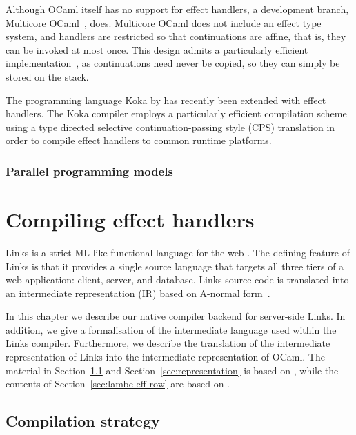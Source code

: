 \documentclass[12pt,mscres,cdtppar,twoside,openright,logo,rightchapter,normalheadings]{infthesis}
\theoremstyle{definition}
\newcommand{\todo}[1]{{\par\noindent\small\color{red} \framebox{\parbox{\dimexpr\linewidth-2\fboxsep-2\fboxrule}{\textbf{TODO:} #1}}}}
\begin{document}
Although OCaml itself has no support for effect handlers, a
development branch, Multicore OCaml~\citep{Dolan2015}, does. Multicore
OCaml does not include an effect type system, and handlers are
restricted so that continuations are affine, that is, they can be
invoked at most once. This design admits a particularly efficient
implementation~\citep{Bruggeman1996}, as continuations need never be
copied, so they can simply be stored on the stack.

The programming language Koka by \citet{Leijen2016} has recently
been extended with effect handlers. The Koka compiler employs a
particularly efficient compilation scheme using a type directed
selective continuation-passing style (CPS) translation in order to
compile effect handlers to common runtime platforms.

\subsection{Parallel programming models}
\todo{\cite{Marlow2013}}

\chapter{Compiling effect handlers}
\label{ch:compiling}

Links is a strict ML-like functional language for the web
\citep{Cooper2006}. The defining feature of Links is that it provides
a single source language that targets all three tiers of a web
application: client, server, and database. Links source code is
translated into an intermediate representation (IR) based on A-normal
form~\citep{Flanagan1993}.

In this chapter we describe our native compiler backend for
server-side Links. In addition, we give a formalisation of the
intermediate language used within the Links compiler. Furthermore, we
describe the translation of the intermediate representation of Links
into the intermediate representation of OCaml. The material in
Section~\ref{sec:compilation-strategy} and
Section~\ref{sec:representation} is based on \cite{Hillerstrom2016b},
while the contents of Section~\ref{sec:lambe-eff-row} are based on
\cite{Hillerstrom2016a}.

\section{Compilation strategy}
\label{sec:compilation-strategy}
\end{document}
